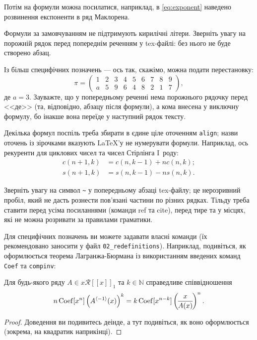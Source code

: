 Потім на формули можна посилатися, наприклад, в \eqref{eq:exponent} наведено розвинення експоненти в ряд Маклорена.

Формули за замовчуванням не підтримують кирилічні літери. Зверніть увагу на 
порожній рядок перед попереднім реченням у tex-файлі: без нього не буде 
створено абзац.

Із більш специфічних позначень --- ось так, скажімо, можна подати 
перестановку:
$$\pi = \begin{pmatrix}
	1 & 2 & 3 & 4 & 5 & 6 & 7 & 8 & 9\\
	a & 5 & 9 & 6 & 4 & 8 & 2 & 1 & 7
\end{pmatrix},$$
де $a=3$. Зауважте, що у попередньому реченні нема порожнього рядочку 
перед <<де>> (та, відповідно, абзацу після формули), а кома внесена у 
виключну формулу, бо інакше вона переїде у наступний рядок тексту.

Декілька формул поспіль треба збирати в єдине ціле оточенням \texttt{align}; назви оточень із зірочками вказують \LaTeX'у не нумерувати формули. Наприклад, ось рекуренти для циклових чисел та чисел Стірлінга 
I~роду:
\begin{align*}
	c(n+1, k) &= c(n, k-1)+nc(n, k); \\
	s(n+1, k) &= s(n, k-1)-ns(n, k).
\end{align*}

Зверніть увагу на символ \verb|~| у попередньому абзаці tex-файлу; це нерозривний пробіл, який не дасть рознести пов'язані 
частини по різних рядках. Тільду треба ставити перед усіма посиланнями 
(команди ref та cite), перед тире та у місцях, які не можна розривати за 
правилами граматики.\cite{DL_book}

Для специфічних позначень ви можете задавати власні команди (їх 
рекомендовано заносити у файл \texttt{02\_redefinitions}). Наприклад, 
подивіться, як оформлюється теорема Лагранжа-Бюрмана із використанням 
введених команд \texttt{Coef} та \texttt{compinv}:

\begin{theorem} \label{thLagrangeBurmann}
	Для будь-якого ряду $A \in x \mathcal R[[x]]_1$ та $k \in \mathbb N$ справедливе співвідношення
	$$n \operatorname{Coef}[x^n] \left( A^{\left\langle -1 \right\rangle}(x) \right)^k = k \operatorname{Coef}[x^{n-k}] \left(\! \frac{x}{A(x)} \!\right)^n.$$
\end{theorem}
\begin{proof}
	Доведення ви подивитесь деінде, а тут подивіться, як воно оформлюється 
	(зокрема, на квадратик наприкінці). 
\end{proof}

